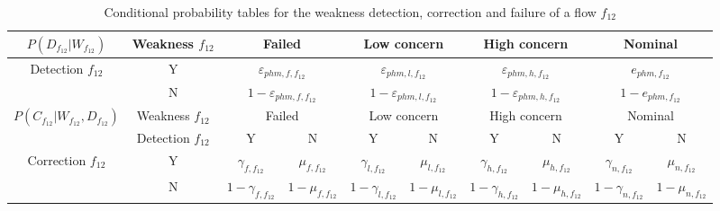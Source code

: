 \renewcommand{\arraystretch}{1.5}
\begin{table}[t] \tiny
\centering
\caption{Conditional probability tables for the weakness detection, correction and failure of a flow $f_{12}$}
\label{tab:cpt_dcf_flow}
\begin{tabular}{|c|c|c|c|c|c|c|c|c|c|}
\hline
$P(D_{f_{12}} | W_{f_{12}})$                              & Weakness $f_{12}$   & \multicolumn{2}{c|}{Failed}                           & \multicolumn{2}{c|}{Low concern}                      & \multicolumn{2}{c|}{High concern}                     & \multicolumn{2}{c|}{Nominal}                 \\ \hline
\multirow{2}{*}{Detection $f_{12}$}                       & Y                   & \multicolumn{2}{c|}{$\varepsilon_{phm, f, f_{12}}$}   & \multicolumn{2}{c|}{$\varepsilon_{phm, l, f_{12}}$}   & \multicolumn{2}{c|}{$\varepsilon_{phm, h, f_{12}}$}   & \multicolumn{2}{c|}{$e_{phm, f_{12}}$}       \\ \cline{2-10} 
                                                          & N                   & \multicolumn{2}{c|}{$1-\varepsilon_{phm, f, f_{12}}$} & \multicolumn{2}{c|}{$1-\varepsilon_{phm, l, f_{12}}$} & \multicolumn{2}{c|}{$1-\varepsilon_{phm, h, f_{12}}$} & \multicolumn{2}{c|}{$1-e_{phm, f_{12}}$}     \\ \hline \hline
\multirow{2}{*}{$P(C_{f_{12}} | W_{f_{12}}, D_{f_{12}})$} & Weakness $f_{12}$   & \multicolumn{2}{c|}{Failed}                           & \multicolumn{2}{c|}{Low concern}                      & \multicolumn{2}{c|}{High concern}                     & \multicolumn{2}{c|}{Nominal}                 \\ \cline{2-10} 
                                                          & Detection $f_{12}$  & Y                           & N                       & Y                           & N                       & Y                           & N                       & Y                      & N                   \\ \hline
\multirow{2}{*}{Correction $f_{12}$}                      & Y                   & $\gamma_{f, f_{12}}$        & $\mu_{f, f_{12}}$       & $\gamma_{l, f_{12}}$        & $\mu_{l, f_{12}}$       & $\gamma_{h, f_{12}}$        & $\mu_{h, f_{12}}$       & $\gamma_{n, f_{12}}$   & $\mu_{n, f_{12}}$   \\ \cline{2-10} 
                                                          & N                   & $1-\gamma_{f, f_{12}}$      & $1-\mu_{f, f_{12}}$     & $1-\gamma_{l, f_{12}}$      & $1-\mu_{l, f_{12}}$     & $1-\gamma_{h, f_{12}}$      & $1-\mu_{h, f_{12}}$     & $1-\gamma_{n, f_{12}}$ & $1-\mu_{n, f_{12}}$ \\ \hline \hline

\end{tabular}
\end{table}
